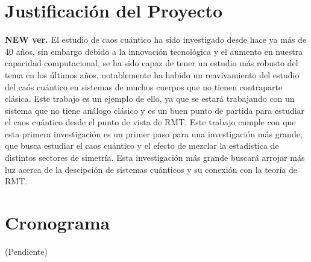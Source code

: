 \documentclass[spanish,titlepage,table]{practicas}
\begin{document}
\section{Justificación del Proyecto}
\textbf{NEW ver.}
El estudio de caos cuántico ha sido investigado desde hace ya más de 40 años, sin embargo debido a la innovación tecnológica y el aumento en nuestra capacidad 
computacional, se ha sido capaz de tener un estudio más robusto del tema en los últimos años, notablemente ha habido un reavivamiento del estudio del caós cuántico 
en sistemas de muchos cuerpos que no tienen contraparte clásica. Este trabajo es un ejemplo de ello, ya que se estará trabajando con 
un sistema que no tiene análogo clásico y es un buen punto de partida para estudiar el caos cuántico desde el punto de vista de RMT.
Este trabajo cumple con que esta primera investigación es 
un primer paso para una investigación más grande, que busca estudiar el caos cuántico y el efecto de mezclar la estadística 
de distintos sectores de simetría. Esta investigación más grande buscará arrojar más luz acerca de la descipción de sistemas cuánticos y su conexión con la teoría de RMT.

\section{Cronograma}
(Pendiente)


\end{document}
